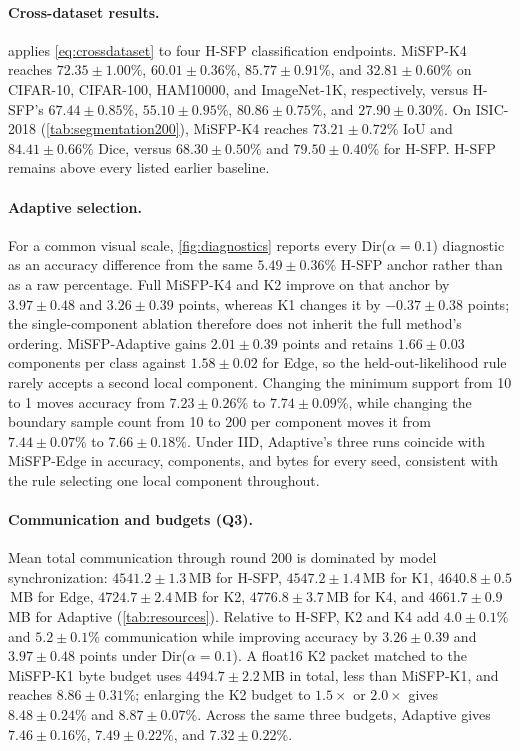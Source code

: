 \paragraph{Cross-dataset results.}
 applies \cref{eq:crossdataset} to four H-SFP classification endpoints. MiSFP-K4 reaches $72.35\pm1.00\%$, $60.01\pm0.36\%$, $85.77\pm0.91\%$, and $32.81\pm0.60\%$ on CIFAR-10, CIFAR-100, HAM10000, and ImageNet-1K, respectively, versus H-SFP's $67.44\pm0.85\%$, $55.10\pm0.95\%$, $80.86\pm0.75\%$, and $27.90\pm0.30\%$. On ISIC-2018 (\cref{tab:segmentation200}), MiSFP-K4 reaches $73.21\pm0.72\%$ IoU and $84.41\pm0.66\%$ Dice, versus $68.30\pm0.50\%$ and $79.50\pm0.40\%$ for H-SFP. H-SFP remains above every listed earlier baseline.

\paragraph{Adaptive selection.}
For a common visual scale, \cref{fig:diagnostics} reports every Dir($\alpha{=}0.1$) diagnostic as an accuracy difference from the same $5.49\pm0.36\%$ H-SFP anchor rather than as a raw percentage. Full MiSFP-K4 and K2 improve on that anchor by $3.97\pm0.48$ and $3.26\pm0.39$ points, whereas K1 changes it by $-0.37\pm0.38$ points; the single-component ablation therefore does not inherit the full method's ordering. MiSFP-Adaptive gains $2.01\pm0.39$ points and retains $1.66\pm0.03$ components per class against $1.58\pm0.02$ for Edge, so the held-out-likelihood rule rarely accepts a second local component. Changing the minimum support from 10 to 1 moves accuracy from $7.23\pm0.26\%$ to $7.74\pm0.09\%$, while changing the boundary sample count from 10 to 200 per component moves it from $7.44\pm0.07\%$ to $7.66\pm0.18\%$. Under IID, Adaptive's three runs coincide with MiSFP-Edge in accuracy, components, and bytes for every seed, consistent with the rule selecting one local component throughout.

\paragraph{Communication and budgets (Q3).}
Mean total communication through round 200 is dominated by model synchronization: $4541.2\pm1.3$\,MB for H-SFP, $4547.2\pm1.4$\,MB for K1, $4640.8\pm0.5$\,MB for Edge, $4724.7\pm2.4$\,MB for K2, $4776.8\pm3.7$\,MB for K4, and $4661.7\pm0.9$\,MB for Adaptive (\cref{tab:resources}). Relative to H-SFP, K2 and K4 add $4.0\pm0.1\%$ and $5.2\pm0.1\%$ communication while improving accuracy by $3.26\pm0.39$ and $3.97\pm0.48$ points under Dir($\alpha{=}0.1$). A float16 K2 packet matched to the MiSFP-K1 byte budget uses $4494.7\pm2.2$\,MB in total, less than MiSFP-K1, and reaches $8.86\pm0.31\%$; enlarging the K2 budget to $1.5\times$ or $2.0\times$ gives $8.48\pm0.24\%$ and $8.87\pm0.07\%$. Across the same three budgets, Adaptive gives $7.46\pm0.16\%$, $7.49\pm0.22\%$, and $7.32\pm0.22\%$.

